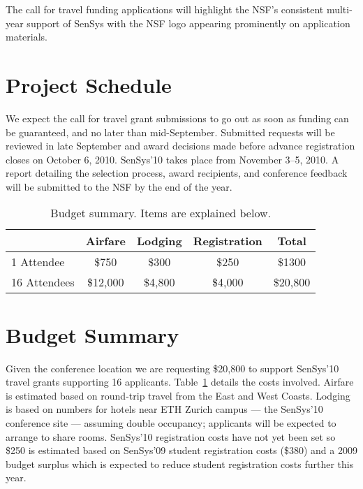 The call for travel funding applications will highlight the NSF's consistent
multi-year support of SenSys with the NSF logo appearing prominently on
application materials.

\section{Project Schedule}

We expect the call for travel grant submissions to go out as soon as funding
can be guaranteed, and no later than mid-September. Submitted requests will
be reviewed in late September and award decisions made before advance
registration closes on October 6, 2010. SenSys'10 takes place from November
3--5, 2010. A report detailing the selection process, award recipients, and
conference feedback will be submitted to the NSF by the end of the year.

\begin{table}[t]
\begin{center}
\begin{tabular}{|l|ccc|c|}
\hline
& \textbf{Airfare} & \textbf{Lodging} & \textbf{Registration} & \textbf{Total} \\
\hline \hline
1 Attendee & \$750 & \$300 & \$250 & \$1300 \\
16 Attendees & \$12,000 & \$4,800 & \$4,000 & \$20,800 \\
\hline
\end{tabular}
\end{center}
\caption{Budget summary. Items are explained below.}
\label{table-budget}
\end{table}

\section{Budget Summary}
\label{sec-budget}

Given the conference location we are requesting \$20,800 to support SenSys'10
travel grants supporting 16 applicants. Table~\ref{table-budget} details the
costs involved. Airfare is estimated based on round-trip travel from the East
and West Coasts. Lodging is based on numbers for hotels near ETH Zurich
campus --- the SenSys'10 conference site --- assuming double occupancy;
applicants will be expected to arrange to share rooms. SenSys'10 registration
costs have not yet been set so \$250 is estimated based on SenSys'09 student
registration costs (\$380) and a 2009 budget surplus which is expected to
reduce student registration costs further this year.

